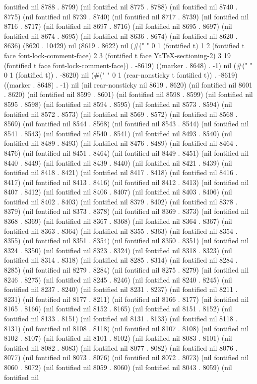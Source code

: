 fontified nil 8788 . 8799) (nil fontified nil 8775 . 8788) (nil fontified nil 8740 . 8775) (nil fontified nil 8739 . 8740) (nil fontified nil 8717 . 8739) (nil fontified nil 8716 . 8717) (nil fontified nil 8697 . 8716) (nil fontified nil 8695 . 8697) (nil fontified nil 8674 . 8695) (nil fontified nil 8636 . 8674) (nil fontified nil 8620 . 8636) (8620 . 10429) nil (8619 . 8622) nil (#("
" 0 1 (fontified t) 1 2 (fontified t face font-lock-comment-face) 2 3 (fontified t face YaTeX-sectioning-2) 3 19 (fontified t face font-lock-comment-face)) . -8619) ((marker . 8648) . -1) nil (#("
" 0 1 (fontified t)) . -8620) nil (#("
" 0 1 (rear-nonsticky t fontified t)) . -8619) ((marker . 8648) . -1) nil (nil rear-nonsticky nil 8619 . 8620) (nil fontified nil 8601 . 8620) (nil fontified nil 8599 . 8601) (nil fontified nil 8598 . 8599) (nil fontified nil 8595 . 8598) (nil fontified nil 8594 . 8595) (nil fontified nil 8573 . 8594) (nil fontified nil 8572 . 8573) (nil fontified nil 8569 . 8572) (nil fontified nil 8568 . 8569) (nil fontified nil 8544 . 8568) (nil fontified nil 8543 . 8544) (nil fontified nil 8541 . 8543) (nil fontified nil 8540 . 8541) (nil fontified nil 8493 . 8540) (nil fontified nil 8489 . 8493) (nil fontified nil 8476 . 8489) (nil fontified nil 8464 . 8476) (nil fontified nil 8451 . 8464) (nil fontified nil 8449 . 8451) (nil fontified nil 8440 . 8449) (nil fontified nil 8439 . 8440) (nil fontified nil 8421 . 8439) (nil fontified nil 8418 . 8421) (nil fontified nil 8417 . 8418) (nil fontified nil 8416 . 8417) (nil fontified nil 8413 . 8416) (nil fontified nil 8412 . 8413) (nil fontified nil 8407 . 8412) (nil fontified nil 8406 . 8407) (nil fontified nil 8403 . 8406) (nil fontified nil 8402 . 8403) (nil fontified nil 8379 . 8402) (nil fontified nil 8378 . 8379) (nil fontified nil 8373 . 8378) (nil fontified nil 8369 . 8373) (nil fontified nil 8368 . 8369) (nil fontified nil 8367 . 8368) (nil fontified nil 8364 . 8367) (nil fontified nil 8363 . 8364) (nil fontified nil 8355 . 8363) (nil fontified nil 8354 . 8355) (nil fontified nil 8351 . 8354) (nil fontified nil 8350 . 8351) (nil fontified nil 8324 . 8350) (nil fontified nil 8323 . 8324) (nil fontified nil 8318 . 8323) (nil fontified nil 8314 . 8318) (nil fontified nil 8285 . 8314) (nil fontified nil 8284 . 8285) (nil fontified nil 8279 . 8284) (nil fontified nil 8275 . 8279) (nil fontified nil 8246 . 8275) (nil fontified nil 8245 . 8246) (nil fontified nil 8240 . 8245) (nil fontified nil 8237 . 8240) (nil fontified nil 8231 . 8237) (nil fontified nil 8211 . 8231) (nil fontified nil 8177 . 8211) (nil fontified nil 8166 . 8177) (nil fontified nil 8165 . 8166) (nil fontified nil 8152 . 8165) (nil fontified nil 8151 . 8152) (nil fontified nil 8133 . 8151) (nil fontified nil 8131 . 8133) (nil fontified nil 8118 . 8131) (nil fontified nil 8108 . 8118) (nil fontified nil 8107 . 8108) (nil fontified nil 8102 . 8107) (nil fontified nil 8101 . 8102) (nil fontified nil 8083 . 8101) (nil fontified nil 8082 . 8083) (nil fontified nil 8077 . 8082) (nil fontified nil 8076 . 8077) (nil fontified nil 8073 . 8076) (nil fontified nil 8072 . 8073) (nil fontified nil 8060 . 8072) (nil fontified nil 8059 . 8060) (nil fontified nil 8043 . 8059) (nil fontified nil 